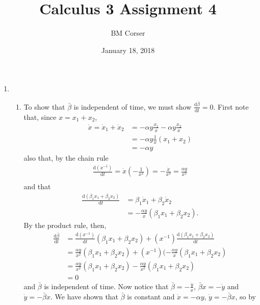 \documentclass[10pt]{article}
\author{BM Corser}
\title{Calculus 3 Assignment 4}
\date{January 18, 2018}
\newcommand*{\dxdt}[1]{\frac{\text{d}#1}{\text{d}t}}
\begin{document}
  \maketitle
  \begin{enumerate}
    \item
      \begin{enumerate}
        \item To show that $\bar\beta$ is independent of time, we must show
          $\dxdt{\bar\beta} = 0$. First note that, since $x = x_1 + x_2$,
          \begin{align*}
            \dot x = \dot x_1 + \dot x_2 
                   &= -\alpha y \frac{x_1}{x} -\alpha y \frac{x_2}{x} \\
                   &= -\alpha y \frac{1}{x}(x_1 + x_2) \\
                   &= -\alpha y
          \end{align*}
          also that, by the chain rule
          \begin{align*}
            \dxdt{(x^{-1})} = \dot x\left(-\frac{1}{x^2}\right)
                           = -\frac{\dot x}{x^2}
                           = \frac{\alpha y}{x^2} \\
          \end{align*}
          and that
          \begin{align*}
            \dxdt{(\beta_1x_1+\beta_2x_2)} &= \beta_1\dot x_1+\beta_2\dot x_2 \\
                           &= -\frac{\alpha y}{x}(\beta_1x_1+\beta_2x_2).
          \end{align*}
          By the product rule, then,
          \begin{align*}
            \dxdt{\bar\beta} &= \dxdt{(x^{-1})}(\beta_1x_1+\beta_2x_2) + (x^{-1})\dxdt{(\beta_1x_1+\beta_2x_2)} \\
                             &= \frac{\alpha y}{x^2}(\beta_1x_1+\beta_2x_2) + (x^{-1})(-\frac{\alpha y}{x}(\beta_1x_1+\beta_2x_2) \\
                             &= \frac{\alpha y}{x^2}(\beta_1x_1+\beta_2x_2) - \frac{\alpha y}{x^2}(\beta_1x_1+\beta_2x_2) \\
                             &= 0
          \end{align*}
          and $\bar\beta$ is independent of time. Now notice that 
          $\bar\beta = -\frac{\dot y}{x}$, $\bar\beta x = -\dot y$ and
          $\dot y = -\bar\beta x$. We have shown that $\bar\beta$ is constant
          and $\dot x = -\alpha y$, $\dot y = - \bar\beta x$, so by

\end{enumerate}
\end{enumerate}
\end{document}
